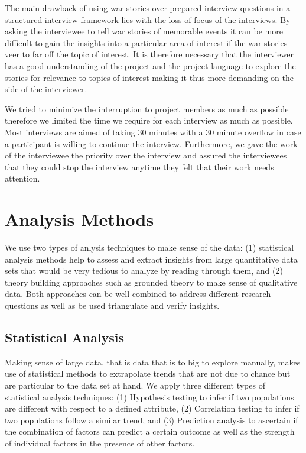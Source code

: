 The main drawback of using war stories over prepared interview questions in a structured interview framework lies with the loss of focus of the interviews.
By asking the interviewee to tell war stories of memorable events it can be more difficult to gain the insights into a particular area of interest if the war stories veer to far off the topic of interest.
It is therefore necessary that the interviewer has a good understanding of the project and the project language to explore the stories for relevance to topics of interest making it thus more demanding on the side of the interviewer.

We tried to minimize the interruption to project members as much as possible therefore we limited the time we require for each interview as much as possible.
Most interviews are aimed of taking 30 minutes with a 30 minute overflow in case a participant is willing to continue the interview.
Furthermore, we gave the work of the interviewee the priority over the interview and assured the interviewees that they could stop the interview anytime they felt that their work needs attention.

\section{Analysis Methods}
\label{c5:sec:analysis}
We use two types of anlysis techniques to make sense of the data: (1) statistical analysis methods help to assess and extract insights from large quantitative data sets that would be very tedious to analyze by reading through them, and (2) theory building approaches such as grounded theory to make sense of qualitative data.
Both approaches can be well combined to address different research questions as well as be used triangulate and verify insights.

\subsection{Statistical Analysis}
Making sense of large data, that is data that is to big to explore manually, makes use of statistical methods to extrapolate trends that are not due to chance but are particular to the data set at hand.
We apply three different types of statistical analysis techniques: (1) Hypothesis testing to infer if two populations are different with respect to a defined attribute, (2) Correlation testing to infer if two populations follow a similar trend, and (3) Prediction analysis to ascertain if the combination of factors can predict a certain outcome as well as the strength of individual factors in the presence of other factors. 


